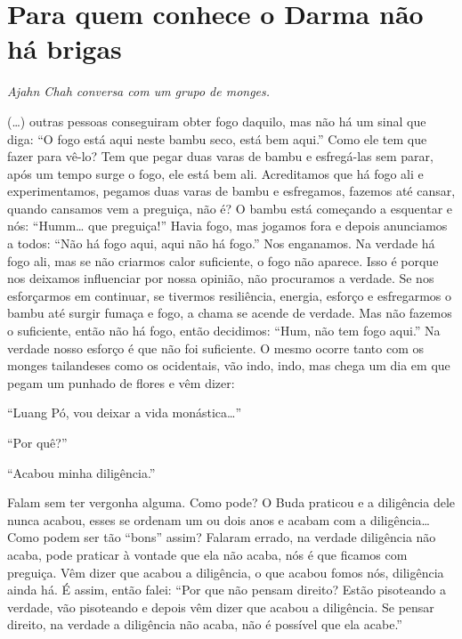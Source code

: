 
\chapter{Para quem conhece o Darma não há brigas}

{\itshape
Ajahn Chah conversa com um grupo de monges.}

(…) outras pessoas conseguiram obter fogo daquilo, mas não há um
sinal que diga: “O fogo está aqui neste bambu seco, está bem aqui.”
Como ele tem que fazer para vê-lo? Tem que pegar duas varas de bambu e
esfregá-las sem parar, após um tempo surge o fogo, ele está bem ali.
Acreditamos que há fogo ali e experimentamos, pegamos duas varas de
bambu e esfregamos, fazemos até cansar, quando cansamos vem a preguiça,
não é? O bambu está começando a esquentar e nós: “Humm… que preguiça!”
Havia fogo, mas jogamos fora e depois anunciamos a todos: “Não há fogo
aqui, aqui não há fogo.” Nos enganamos. Na verdade há fogo ali, mas se
não criarmos calor suficiente, o fogo não aparece. Isso é porque nos
deixamos influenciar por nossa opinião, não procuramos a verdade. Se
nos esforçarmos em continuar, se tivermos resiliência, energia, esforço
e esfregarmos o bambu até surgir fumaça e fogo, a chama se acende de
verdade. Mas não fazemos o suficiente, então não há fogo, então
decidimos: “Hum, não tem fogo aqui.” Na verdade nosso esforço é que não
foi suficiente. O mesmo ocorre tanto com os monges tailandeses como os
ocidentais, vão indo, indo, mas chega um dia em que pegam um punhado de
flores e vêm dizer:

“Luang Pó, vou deixar a vida monástica…” 

“Por quê?” 

“Acabou minha diligência.” 

Falam sem ter vergonha alguma. Como pode? O Buda praticou e a
diligência dele nunca acabou, esses se ordenam um ou dois anos e acabam
com a diligência… Como podem ser tão “bons” assim? Falaram errado, na
verdade diligência não acaba, pode praticar à vontade que ela não
acaba, nós é que ficamos com preguiça. Vêm dizer que acabou a
diligência, o que acabou fomos nós, diligência ainda há. É assim, então
falei: “Por que não pensam direito? Estão pisoteando a verdade, vão
pisoteando e depois vêm dizer que acabou a diligência. Se pensar
direito, na verdade a diligência não acaba, não é possível que ela
acabe.”

